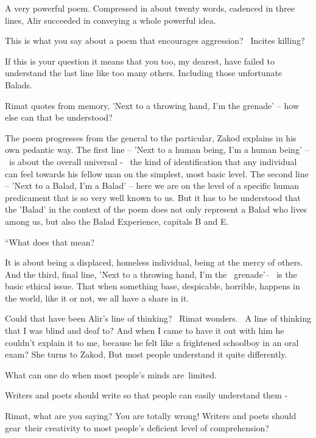 \documentclass[12pt]{book}
\begin{document}
{\textquotedbl}A very powerful poem. Compressed in about twenty words, cadenced in three lines, Alir succeeded in
conveying a whole powerful idea.{\textquotedbl}~

{\textquotedbl}This is what you say about a poem that encourages aggression? ~Incites killing?{\textquotedbl}

{\textquotedbl}If this is your question it means that you too, my dearest, have failed to understand the last line like
too many others. Including those unfortunate Balads.{\textquotedbl}

Rimat quotes from memory, 'Next to a throwing hand, I'm the grenade' -- how else can that be understood?{\textquotedbl}

{\textquotedbl}The poem progresses from the general to the particular,{\textquotedbl} Zakod explains in his own pedantic
way. {\textquotedbl}The first line -- 'Next to a human being, I'm a human being' --~is about the overall universal -
\ the kind of identification that any individual can feel towards his fellow man on the simplest, most basic level. The
second line -- 'Next to a Balad, I'm a Balad' -- here we are on the level of a specific human predicament that is so
very well known to us. But it has to be understood that the 'Balad' in the context of the poem does not only represent
a Balad who lives among us, but also the Balad Experience, capitals B and E.{\textquotedbl}{ }

{}``What does that mean?{\textquotedbl}

{\textquotedbl}It is about being a displaced, homeless individual, being at the mercy of others. And the third, final
line, 'Next to a throwing hand, I'm the~ grenade'--~ is the basic ethical issue. That when something base, despicable,
horrible, happens in the world, like it or not, we all have a share in
it.{\textquotedbl}{ }

Could that have been Alir's line of thinking? \ Rimat wonders. \ A line of thinking that I was blind and deaf to? And
when I came to have it out with him he couldn't explain it to me, because he felt like a frightened schoolboy in an
oral exam? She turns to{ }Zakod, {\textquotedbl}But most people understand it
quite differently.{\textquotedbl}

{\textquotedbl}What can one do when most people's minds are~limited.{\textquotedbl}

{\textquotedbl}Writers and poets should write so that people can easily understand them -{\textquotedbl}

{\textquotedbl}Rimat, what are you saying? You are totally wrong! Writers and poets should gear~their creativity to most
people's deficient level of comprehension?{\textquotedbl}
\end{document}

